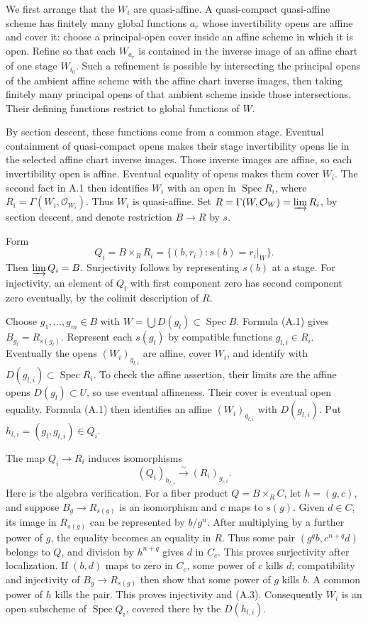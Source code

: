\documentclass[11pt]{article}
\begin{document}
We first arrange that the \(W_i\) are quasi-affine. A quasi-compact
quasi-affine scheme has finitely many global functions \(a_r\) whose
invertibility opens are affine and cover it: choose a principal-open
cover inside an affine scheme in which it is open. Refine so that each
\(W_{a_r}\) is contained in the inverse image of an affine chart of one
stage \(W_{i_0}\). Such a refinement is possible by intersecting the
principal opens of the ambient affine scheme with the affine chart
inverse images, then taking finitely many principal opens of that
ambient scheme inside those intersections. Their defining functions
restrict to global functions of \(W\).

By section descent, these functions come from a common stage. Eventual
containment of quasi-compact opens makes their stage invertibility opens
lie in the selected affine chart inverse images. Those inverse images
are affine, so each invertibility open is affine. Eventual equality of
opens makes them cover \(W_i\). The second fact in A.1 then identifies
\(W_i\) with an open in \(\operatorname{Spec}R_i\), where
\(R_i=\Gamma(W_i,\mathcal O_{W_i})\). Thus \(W_i\) is quasi-affine. Set
\(R=\Gamma(W,\mathcal O_W)=\varinjlim R_i\), by section descent, and
denote restriction \(B\to R\) by \(s\).

Form \[
Q_i=B\times_R R_i
=\{(b,r_i):s(b)=r_i|_W\}.
\tag{A.2}
\] Then \(\varinjlim Q_i=B\). Surjectivity follows by representing
\(s(b)\) at a stage. For injectivity, an element of \(Q_i\) with first
component zero has second component zero eventually, by the colimit
description of \(R\).

Choose \(g_1,\ldots,g_m\in B\) with
\(W=\bigcup D(g_l)\subset\operatorname{Spec}B\). Formula (A.1) gives
\(B_{g_l}=R_{s(g_l)}\). Represent each \(s(g_l)\) by compatible
functions \(g_{l,i}\in R_i\). Eventually the opens \((W_i)_{g_{l,i}}\)
are affine, cover \(W_i\), and identify with
\(D(g_{l,i})\subset\operatorname{Spec}R_i\). To check the affine
assertion, their limits are the affine opens \(D(g_l)\subset U\), so use
eventual affineness. Their cover is eventual open equality. Formula
(A.1) then identifies an affine \((W_i)_{g_{l,i}}\) with \(D(g_{l,i})\).
Put \(h_{l,i}=(g_l,g_{l,i})\in Q_i\).

The map \(Q_i\to R_i\) induces isomorphisms \[
(Q_i)_{h_{l,i}}\xrightarrow{\sim}(R_i)_{g_{l,i}}.
\tag{A.3}
\] Here is the algebra verification. For a fiber product
\(Q=B\times_R C\), let \(h=(g,c)\), and suppose \(B_g\to R_{s(g)}\) is
an isomorphism and \(c\) maps to \(s(g)\). Given \(d\in C\), its image
in \(R_{s(g)}\) can be represented by \(b/g^n\). After multiplying by a
further power of \(g\), the equality becomes an equality in \(R\). Thus
some pair \((g^q b,c^{n+q}d)\) belongs to \(Q\), and division by
\(h^{n+q}\) gives \(d\) in \(C_c\). This proves surjectivity after
localization. If \((b,d)\) maps to zero in \(C_c\), some power of \(c\)
kills \(d\); compatibility and injectivity of \(B_g\to R_{s(g)}\) then
show that some power of \(g\) kills \(b\). A common power of \(h\) kills
the pair. This proves injectivity and (A.3). Consequently \(W_i\) is an
open subscheme of \(\operatorname{Spec}Q_i\), covered there by the
\(D(h_{l,i})\).
\end{document}
